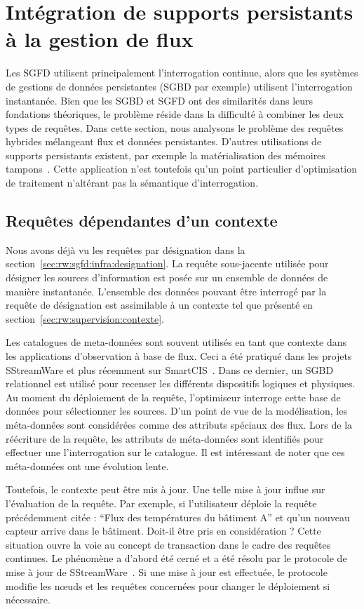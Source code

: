 \section{Intégration de supports persistants à la gestion de flux}\label{sec:rw:sgfd:persistance}
Les SGFD utilisent principalement l'interrogation continue, alors que les systèmes de gestions de données persistantes (SGBD par exemple) utilisent l'interrogation instantanée. Bien que les SGBD et SGFD ont des similarités dans leurs fondations théoriques, le problème réside dans la difficulté à combiner les deux types de requêtes. Dans cette section, nous analysons le problème des requêtes hybrides mélangeant flux et données persistantes. D'autres utilisations de supports persistants existent, par exemple la matérialisation des mémoires tampons~\cite{Abadi:aurora}. Cette application n'est toutefois qu'un point particulier d'optimisation de traitement n'altérant pas la sémantique d'interrogation.

\subsection{Requêtes dépendantes d'un contexte}
Nous avons déjà vu les requêtes par désignation dans la section~\ref{sec:rw:sgfd:infra:designation}. La requête sous-jacente utilisée pour désigner les sources d'information est posée sur un ensemble de données de manière instantanée. L'ensemble des données pouvant être interrogé par la requête de désignation est assimilable à un contexte tel que présenté en section~\ref{sec:rw:supervision:contexte}.

Les catalogues de meta-données sont souvent utilisés en tant que contexte dans les applications d'observation à base de flux. Ceci a été pratiqué dans les projets SStreamWare et plus récemment sur SmartCIS~\cite{Liu:smartcis}. Dans ce dernier, un SGBD relationnel est utilisé pour recenser les différents dispositifs logiques et physiques. Au moment du déploiement de la requête, l'optimiseur interroge cette base de données pour sélectionner les sources. D'un point de vue de la modélisation, les méta-données sont considérées comme des attributs spéciaux des flux. Lors de la réécriture de la requête, les attributs de méta-données sont identifiés pour effectuer une l'interrogation sur le catalogue. Il est intéressant de noter que ces méta-données ont une évolution lente.

Toutefois, le contexte peut être mis à jour. Une telle mise à jour influe sur l'évaluation de la requête. Par exemple, si l'utilisateur déploie la requête précédemment citée : \enquote{Flux des températures du bâtiment A} et qu'un nouveau capteur arrive dans le bâtiment. Doit-il être pris en considération ? Cette situation ouvre la voie au concept de transaction dans le cadre des requêtes continues. Le phénomène a d'abord été cerné et a été résolu par le protocole de mise à jour de SStreamWare~\cite{Gurgen:transaction}. Si une mise à jour est effectuée, le protocole modifie les nœuds et les requêtes concernées pour changer le déploiement si nécessaire.

